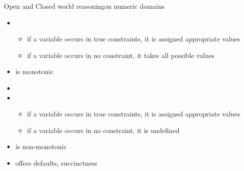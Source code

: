 \begin{frame}{Open and Closed world reasoning}{on numeric domains}
  \bigskip
  \begin{itemize}
  \item<1-> 
    \begin{itemize}
    \item if a variable occurs in true constraints, it is assigned appropriate values
    \item if a variable occurs in no constraint, it takes all possible values
    \end{itemize}
  \item<only@3->[] is monotonic
  \item<only@1-2>[]
  \item<2-> 
    \begin{itemize}
    \item if a variable occurs in true constraints, it is assigned appropriate values
    \item if a variable occurs in no constraint, it is undefined
    \end{itemize}
  \item<only@3->[] is non-monotonic
  \item<only@4->[] offers defaults, succinctness
  \end{itemize}
\end{frame}
%
